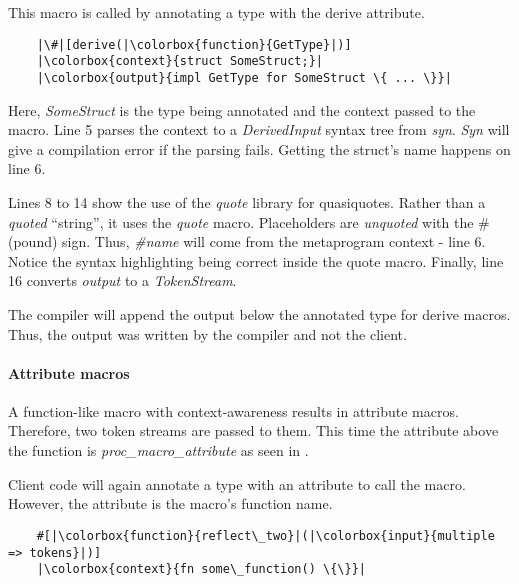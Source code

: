 This macro is called by annotating a type with the derive attribute.

\begin{verbatim}
	|\#|[derive(|\colorbox{function}{GetType}|)]
	|\colorbox{context}{struct SomeStruct;}|
	|\colorbox{output}{impl GetType for SomeStruct \{ ... \}}|
\end{verbatim}

Here, \textit{SomeStruct} is the type being annotated and the \colorbox{context}{context} passed to the macro.
Line 5 parses the context to a \textit{DerivedInput} syntax tree from \textit{syn}.
\textit{Syn} will give a compilation error if the parsing fails.
Getting the struct's name happens on line 6.

Lines 8 to 14 show the use of the \textit{quote} library for quasiquotes.
Rather than a \textit{quoted} ``string'', it uses the \textit{quote} macro.
Placeholders are \textit{unquoted} with the \# (pound) sign.
Thus, \textit{\#name} will come from the metaprogram context - line 6.
Notice the syntax highlighting being correct inside the quote macro.
Finally, line 16 converts \textit{output} to a \textit{TokenStream}.

The compiler will append the \colorbox{output}{output} below the annotated type for derive macros.
Thus, the \colorbox{output}{output} was written by the compiler and not the client.

\paragraph{Attribute macros}
A function-like macro with context-awareness results in attribute macros.
Therefore, two token streams are passed to them.
This time the attribute above the function is \textit{proc\_macro\_attribute} as seen in .


Client code will again annotate a type with an attribute to call the macro.
However, the attribute is the macro's \colorbox{function}{function name}.

\begin{verbatim}
	#[|\colorbox{function}{reflect\_two}|(|\colorbox{input}{multiple => tokens}|)]
	|\colorbox{context}{fn some\_function() \{\}}|
\end{verbatim}

